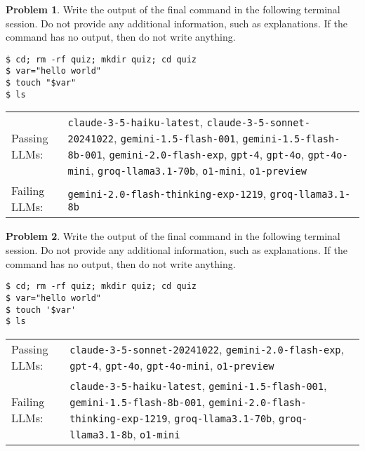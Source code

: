 \documentclass[10pt]{article}
\theoremstyle{definition}
\newtheorem{problem}{Problem}
\begin{document}
\begin{samepage}

\begin{problem}
Write the output of the final command in the following terminal session.
Do not provide any additional information,
such as explanations.
If the command has no output,
then do not write anything.

\end{problem}
\begin{lstlisting}
$ cd; rm -rf quiz; mkdir quiz; cd quiz
$ var="hello world"
$ touch "$var"
$ ls
\end{lstlisting}


\noindent
\begin{tabular}{p{1.0in}L{5in}}
Passing LLMs: & {\lstinline$claude-3-5-haiku-latest$}, {\lstinline$claude-3-5-sonnet-20241022$}, {\lstinline$gemini-1.5-flash-001$}, {\lstinline$gemini-1.5-flash-8b-001$}, {\lstinline$gemini-2.0-flash-exp$}, {\lstinline$gpt-4$}, {\lstinline$gpt-4o$}, {\lstinline$gpt-4o-mini$}, {\lstinline$groq-llama3.1-70b$}, {\lstinline$o1-mini$}, {\lstinline$o1-preview$} \\
Failing LLMs: & {\lstinline$gemini-2.0-flash-thinking-exp-1219$}, {\lstinline$groq-llama3.1-8b$} \\
\end{tabular}

\end{samepage}
\begin{samepage}

\begin{problem}
Write the output of the final command in the following terminal session.
Do not provide any additional information,
such as explanations.
If the command has no output,
then do not write anything.

\end{problem}
\begin{lstlisting}
$ cd; rm -rf quiz; mkdir quiz; cd quiz
$ var="hello world"
$ touch '$var'
$ ls
\end{lstlisting}


\noindent
\begin{tabular}{p{1.0in}L{5in}}
Passing LLMs: & {\lstinline$claude-3-5-sonnet-20241022$}, {\lstinline$gemini-2.0-flash-exp$}, {\lstinline$gpt-4$}, {\lstinline$gpt-4o$}, {\lstinline$gpt-4o-mini$}, {\lstinline$o1-preview$} \\
Failing LLMs: & {\lstinline$claude-3-5-haiku-latest$}, {\lstinline$gemini-1.5-flash-001$}, {\lstinline$gemini-1.5-flash-8b-001$}, {\lstinline$gemini-2.0-flash-thinking-exp-1219$}, {\lstinline$groq-llama3.1-70b$}, {\lstinline$groq-llama3.1-8b$}, {\lstinline$o1-mini$} \\
\end{tabular}

\end{samepage}
\end{document}
